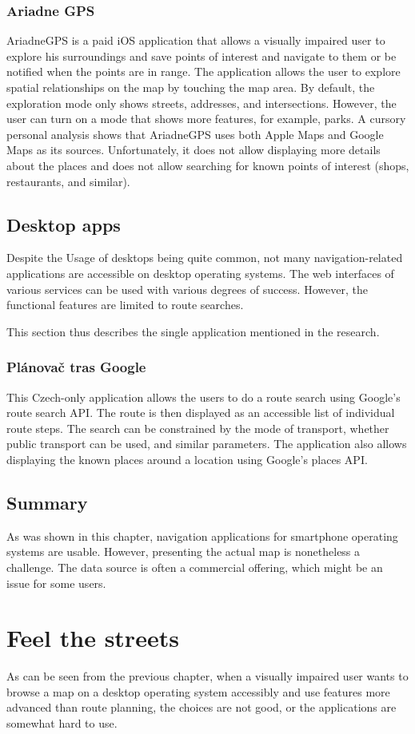 \documentclass[nolof,digital]{fithesis3}
\begin{document}
\subsection{Ariadne GPS}
AriadneGPS \parencite{ariadnegps} is a paid iOS application that allows a visually impaired user to explore his surroundings and save points of interest and navigate to them or be notified when the points are in range. The application allows the user to explore spatial relationships on the map by touching the map area. By default, the exploration mode only shows streets, addresses, and intersections. However, the user can turn on a mode that shows more features, for example, parks. A cursory personal analysis shows that AriadneGPS uses both Apple Maps and Google Maps as its sources. Unfortunately, it does not allow displaying more details about the places and does not allow searching for known points of interest (shops, restaurants, and similar).
\section{Desktop apps}
Despite the Usage of desktops being quite common, not many navigation-related applications are accessible on desktop operating systems. The web interfaces of various services can be used with various degrees of success. However, the functional features are limited to route searches.

This section thus describes the single application mentioned in the research.
\subsection{Plánovač tras Google}
This Czech-only application \parencite{ptg} allows the users to do a route search using Google's route search API. The route is then displayed as an accessible list of individual route steps. The search can be constrained by the mode of transport, whether public transport can be used, and similar parameters. The application also allows displaying the known places around a location using Google's places API.
\section{Summary}
As was shown in this chapter, navigation applications for smartphone operating systems are usable. However, presenting the actual map is nonetheless a challenge. The data source is often a commercial offering, which might be an issue for some users.
\chapter{Feel the streets} \label{ref:fts}
As can be seen from the previous chapter, when a visually impaired user wants to browse a map on a desktop operating system accessibly and use features more advanced than route planning, the choices are not good, or the applications are somewhat hard to use.
\end{document}
